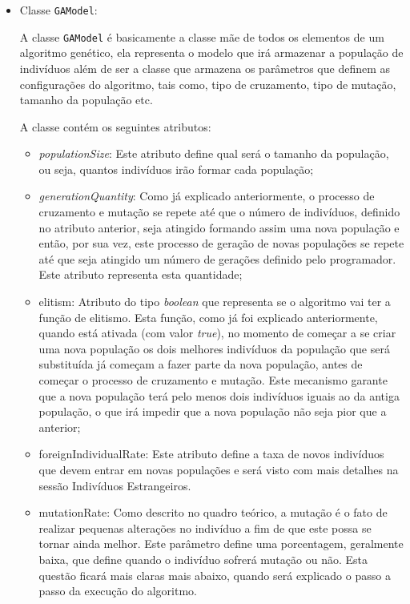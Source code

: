 \begin{itemize}
	
	\item Classe \texttt{GAModel}:
	\par A classe \texttt{GAModel} é basicamente a classe mãe de todos os elementos de um algoritmo genético, 
	ela representa o modelo que irá armazenar a população de indivíduos além de ser a classe que armazena os 
	parâmetros que definem as configurações do algoritmo, tais como, tipo de cruzamento, tipo de mutação, 
	tamanho da população etc.
	
	\par A classe contém os seguintes atributos:
	
	\begin{itemize} 
		\item \textit{populationSize}:
		Este atributo define qual será o tamanho da população, ou seja, quantos indivíduos irão formar cada população;
		
		\item \textit{generationQuantity}:
		Como já explicado anteriormente, o processo de cruzamento e mutação se repete até que o número de indivíduos, 
		definido no atributo anterior, seja atingido formando assim uma nova população e então, por sua vez, 
		este processo de geração de novas populações se repete até que seja atingido um número de gerações definido 
		pelo programador. Este atributo representa esta quantidade;
		
		\item{elitism}:
		Atributo do tipo \textit{boolean} que representa se o algoritmo vai ter a função de elitismo. 
		Esta função, como já foi explicado anteriormente, quando está ativada (com valor \textit{true}), 
		no momento de começar a se criar uma nova população os dois melhores indivíduos da população que será 
		substituída já começam a fazer parte da nova população, antes de começar o processo de cruzamento e mutação. 
		Este mecanismo garante que a nova população terá pelo menos dois indivíduos iguais ao da antiga população, o que irá 
		impedir que a nova população não seja pior que a anterior;
		
		\item{foreignIndividualRate}:
		Este atributo define a taxa de novos indivíduos que devem entrar em novas populações e será visto com mais detalhes
		na sessão Indivíduos Estrangeiros.
		
		\item{mutationRate}:
		Como descrito no quadro teórico, a mutação é o fato de realizar pequenas alterações no indivíduo a fim de que 
		este possa se tornar ainda melhor. Este parâmetro define uma porcentagem, geralmente baixa, que define quando 
		o indivíduo sofrerá mutação ou não. Esta questão ficará mais claras mais abaixo, quando será explicado o passo 
		a passo da execução do algoritmo.
		

\end{itemize}
\end{itemize}
